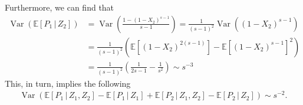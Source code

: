 \documentclass[letterpaper,10pt]{article}
\numberwithin{equation}{section}
\numberwithin{thm}{section}
\newcommand{\E}{\mathbb{E}}
\newcommand{\1}{\mathbb{1}}
\begin{document}
Furthermore, we can find that
\begin{equation*}
	\begin{aligned}
		\operatorname{Var}\left(\mathbb{E}[P_1 \, | \, Z_2]\right)
		 & = \operatorname{Var}\left(\frac{1 - (1-X_2)^{s-1}}{s-1}\right)
		= \frac{1}{(s-1)^2} \operatorname{Var}\left((1-X_2)^{s-1}\right)                                                    \\
		 & = \frac{1}{(s-1)^2}\left(\mathbb{E}\left[(1-X_2)^{2(s-1)}\right] - \mathbb{E}\left[(1-X_2)^{s-1}\right]^2\right) \\
		 & = \frac{1}{(s-1)^2}\left(\frac{1}{2s - 1} - \frac{1}{s^2}\right)
		\sim s^{-3}
	\end{aligned}
\end{equation*}
This, in turn, implies the following
\begin{equation*}
	\begin{aligned}
		\operatorname{Var}\left(\E[P_1 \, | \, Z_1, Z_2] - \E[P_1 \, | \, Z_1] + \E[P_2 \, | \, Z_1, Z_2] - \E[P_2 \, | \, Z_2]\right)
		\sim s^{-2}.
	\end{aligned}
\end{equation*}
\end{document}
